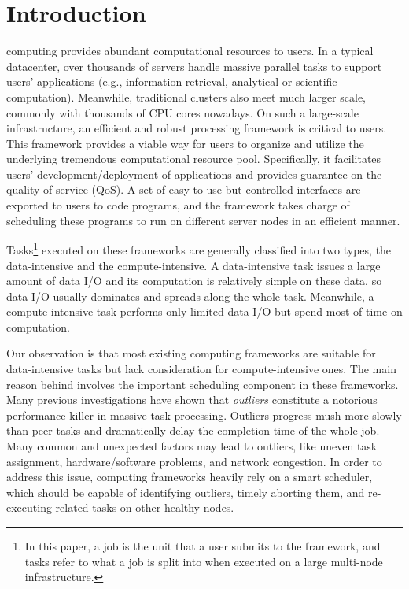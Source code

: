 \section{Introduction}

 computing provides abundant computational resources to users. In a typical datacenter, over thousands of servers handle massive parallel tasks to support users' applications (e.g., information retrieval, analytical or scientific computation). Meanwhile, traditional clusters also meet much larger scale, commonly with thousands of CPU cores nowadays. On such a large-scale infrastructure, an efficient and robust processing framework is critical to users. This framework provides a viable way for users to organize and utilize the underlying tremendous computational resource pool. Specifically, it facilitates users' development/deployment of applications and provides guarantee on the quality of service (QoS). A set of easy-to-use but controlled interfaces are exported to users to code programs, and the framework takes charge of scheduling these programs to run on different server nodes in an efficient manner.

Tasks\footnote{In this paper, a job is the unit that a user submits to the framework, and tasks refer to what a job is split into when executed on a large multi-node infrastructure.} executed on these frameworks are generally classified into two types, the data-intensive and the compute-intensive. A data-intensive task issues a large amount of data I/O and its computation is relatively simple on these data, so data I/O usually dominates and spreads along the whole task. Meanwhile, a compute-intensive task performs only limited data I/O but spend most of time on computation.

Our observation is that most existing computing frameworks are suitable for data-intensive tasks but lack consideration for compute-intensive ones. The main reason behind involves the important scheduling component in these frameworks. Many previous investigations have shown that \textit{outliers} constitute a notorious performance killer in massive task processing. Outliers progress mush more slowly than peer tasks and dramatically delay the completion time of the whole job. Many common and unexpected factors may lead to outliers, like uneven task assignment, hardware/software problems, and network congestion. In order to address this issue, computing frameworks heavily rely on a smart scheduler, which should be capable of identifying outliers, timely aborting them, and re-executing related tasks on other healthy nodes.


